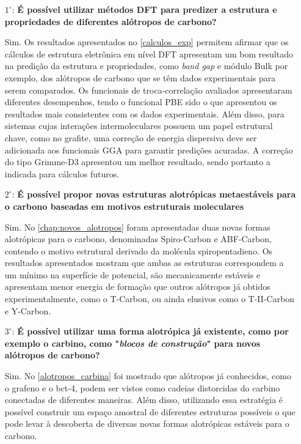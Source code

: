 	\begin{enumerate}
		


		\item[$1^{\circ}$:] \textbf{É possível utilizar métodos DFT para predizer a estrutura e propriedades de diferentes alótropos de carbono?}
			
			Sim. Os resultados apresentados no \autoref{calculos_exp} permitem afirmar que os cálculos de estrutura eletrônica em nível DFT apresentam um bom resultado na predição da estrutura e propriedades, como \textit{band gap} e módulo Bulk por exemplo, dos alótropos de carbono que se têm dados experimentais para serem comparados. Os funcionais de troca-correlação avaliados apresentaram diferentes desempenhos, tendo o funcional PBE sido o que apresentou os resultados mais consistentes com os dados experimentais. Além disso, para sistemas cujas interações intermoleculares possuem um papel estrutural chave, como no grafite, uma correção de energia dispersiva deve ser adicionada aos funcionais GGA para garantir predições acuradas. A correção do tipo Grimme-D3 apresentou um melhor resultado, sendo portanto a indicada para cálculos futuros.
	
		\item[$2^{\circ}$:] \textbf{É possível propor novas estruturas alotrópicas metaestáveis para o carbono baseadas em motivos estruturais moleculares}
			
			Sim. No \autoref{chap:novos_alotropos} foram apresentadas duas novas formas alotrópicas para o carbono, denominadas Spiro-Carbon e ABF-Carbon, contendo o motivo estrutural derivado da molécula spiropentadieno. Os resultados apresentados mostram que ambas as estruturas correspondem a um mínimo na superfície de potencial, são mecanicamente estáveis e apresentam menor energia de formação que outros alótropos já obtidos experimentalmente, como o T-Carbon, ou ainda elusivos como o T-II-Carbon e Y-Carbon.
	
		\item[$3^{\circ}$:] \textbf{É possível utilizar uma forma alotrópica já existente, como por exemplo o carbino, como "\textit{blocos de construção}" para novos alótropos de carbono?}
		
			Sim. No \autoref{alotropos_carbina} foi mostrado que alótropos já conhecidos, como o grafeno e o bct-4, podem ser vistos como cadeias distorcidas do carbino conectadas de diferentes maneiras. Além disso, utilizando essa estratégia é possível construir um espaço amostral de diferentes estruturas possíveis o que pode levar à descoberta de diversas novas formas alotrópicas estáveis para o carbono.
		
	\end{enumerate}
